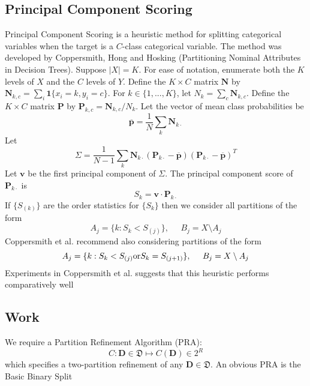 \documentclass[11pt]{article}
\begin{document}
\subsection{Principal Component Scoring}
Principal Component Scoring is a heuristic method for splitting categorical variables when the target is a $C$-class categorical variable. The method was developed by Coppersmith, Hong and Hosking (Partitioning Nominal Attributes in Decision Trees). Suppose $|X| = K$. For ease of notation, enumerate both the $K$ levels of $X$ and the $C$ levels of $Y$. Define the $K \times C$ matrix $\mathbf{N}$ by $\mathbf{N}_{k,c} = \sum_i \mathbf{1} \{ x_i = k, y_i = c \}$. For $k \in \{ 1,...,K \}$, let $N_k = \sum_{c} \mathbf{N}_{k,c}$. Define the $K \times C$ matrix $\mathbf{P}$ by $\mathbf{P}_{k,c} = \mathbf{N}_{k,c} / N_k$.
Let the vector of mean class probabilities be
$$\overline{\mathbf{p}} = \frac{1}{N} \sum_k \mathbf{N}_{k \cdot}$$
Let
$$\Sigma = \frac{1}{N-1} \sum_k \mathbf{N}_{k \cdot} \left( \mathbf{P}_{k \cdot} - \overline{\mathbf{p}} \right)
\left( \mathbf{P}_{k \cdot} - \overline{\mathbf{p}} \right)^T$$
Let $\mathbf{v}$ be the first principal component of $\Sigma$. The principal component score of $\mathbf{P}_{k \cdot}$ is $$S_k = \mathbf{v} \cdot \mathbf{P}_{k \cdot}$$
If $\{ S_{\left( k \right)} \}$ are the order statistics for $\{ S_k \}$ then we consider all partitions of the form
\begin{equation}
A_j = \{ k : S_k < S_{\left( j \right)} \}, \;\;\;\;\;
B_j = X \setminus A_j
\end{equation}
Coppersmith et al. recommend also considering partitions of the form
\begin{equation}
A_j = \{ k : S_k < S_{\left( j \right)} \textup{or} S_k = S_{\left( j + 1 \right)} \}, \;\;\;\;\; B_j = X \setminus A_j
\end{equation}
Experiments in Coppersmith et al. suggests that this heuristic performs comparatively well
\subsection{Work}
We require a Partition Refinement Algorithm (PRA):
\begin{equation}
C : \mathbf{D} \in \mathfrak{D} \mapsto C \left( \mathbf{D} \right) \in 2^R
\end{equation}
which specifies a two-partition refinement of any $\mathbf{D} \in \mathfrak{D}$.
An obvious PRA is the Basic Binary Split
\end{document}
